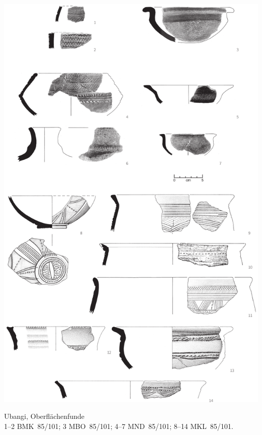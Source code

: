 \begin{pl}[H]
	\includegraphics{plt/Taf17.pdf}
	\vspace{.75em}\caption{\mbox{Ubangi}, Oberflächenfunde \\ 1--2 BMK~85/101; 3 MBO~85/101; 4--7 MND~85/101; 8--14 MKL~85/101.}
	\label{pl:17}
\end{pl}


